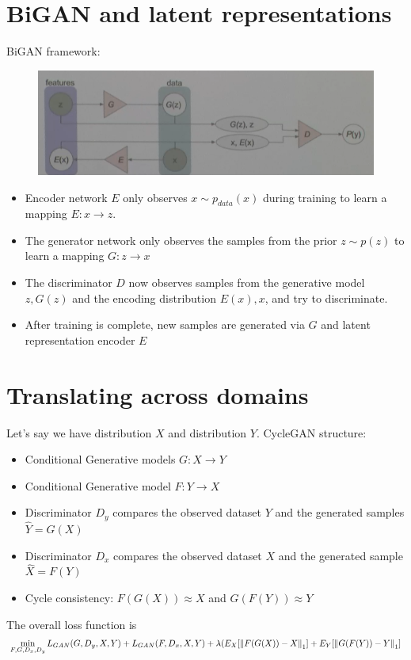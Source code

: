 \section{BiGAN and latent representations} 
BiGAN framework: 
    \begin{figure}[H]
        \centering
        \includegraphics{images/003_BiGAN.png}
    \end{figure}
\begin{itemize}
    \item Encoder network $E$ only observes $x\sim p_{data}(x)$ during training to learn a mapping $E:x \to z$.
    \item The generator network only observes the samples from the prior $z \sim p(z)$ to learn a mapping $G:z\to x$
    \item The discriminator $D$ now observes samples from the generative model $z, G(z)$ and the encoding distribution $E(x), x$, and try to discriminate. 
    \item After training is complete, new samples are generated via $G$ and latent representation encoder $E$
\end{itemize}

\section{Translating across domains} 
Let's say we have distribution $X$ and distribution $Y$. CycleGAN structure: 
    \begin{itemize}
        \item Conditional Generative models $G: X \to Y$
        \item Conditional Generative model $F: Y \to X$
        \item Discriminator $D_y$ compares the observed dataset $Y$ and the generated samples $\hat{Y}=G(X)$
        \item Discriminator $D_x$ compares the observed dataset $X$ and the generated sample $\hat{X} = F(Y)$
        \item Cycle consistency: $F(G(X)) \approx X$ and $G(F(Y)) \approx Y$
    \end{itemize}
The overall loss function is 
    \begin{align*}
        \min_{F,G,D_x,D_y} L_{GAN}(G,D_y,X,Y) + L_{GAN}(F,D_x,X,Y) + \lambda (E_X[\left\lVert F(G(X)) - X\right\rVert_1] + E_Y[\left\lVert G(F(Y))-Y\right\rVert_1]
    \end{align*}

